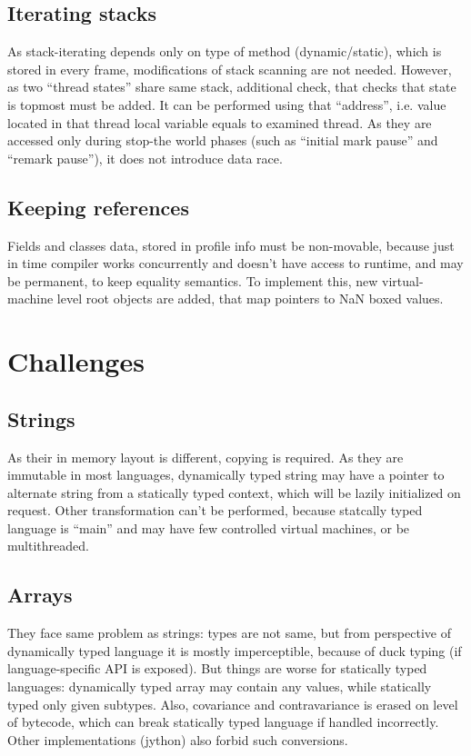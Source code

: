 \documentclass[times,specification,annotation]{itmo-student-thesis}
\begin{document}
\subsection{Iterating stacks}
As stack-iterating depends only on type of method (dynamic/static), which is stored in every frame, modifications of stack scanning are not needed. However, as two ``thread states'' share same stack, additional check, that checks that state is topmost must be added. It can be performed using that ``address'', i.e. value located in that thread local variable equals to examined thread. As they are accessed only during stop-the world phases (such as ``initial mark pause'' and ``remark pause''), it does not introduce data race.
\subsection{Keeping references}
Fields and classes data, stored in profile info must be non-movable, because just in time compiler works concurrently and doesn't have access to runtime, and may be permanent, to keep equality semantics. To implement this, new virtual-machine level root objects are added, that map pointers to NaN boxed values.

\section{Challenges}
\subsection{Strings}
As their in memory layout is different, copying is required. As they are immutable in most languages, dynamically typed string may have a pointer to alternate string from a statically typed context, which will be lazily initialized on request. Other transformation can't be performed, because statcally typed language is ``main'' and may have few controlled virtual machines, or be multithreaded.
\subsection{Arrays}
They face same problem as strings: types are not same, but from perspective of dynamically typed language it is mostly imperceptible, because of duck typing (if language-specific API is exposed). But things are worse for statically typed languages: dynamically typed array may contain any values, while statically typed only given subtypes. Also, covariance and contravariance is erased on level of bytecode, which can break statically typed language if handled incorrectly. Other implementations (jython) also forbid such conversions.
\end{document}
